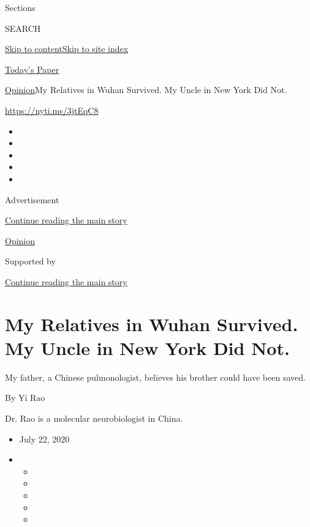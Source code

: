 Sections

SEARCH

\protect\hyperlink{site-content}{Skip to
content}\protect\hyperlink{site-index}{Skip to site index}

\href{https://myaccount.nytimes.com/auth/login?response_type=cookie\&client_id=vi}{}

\href{https://www.nytimes.com/section/todayspaper}{Today's Paper}

\href{/section/opinion}{Opinion}\textbar{}My Relatives in Wuhan
Survived. My Uncle in New York Did Not.

\href{https://nyti.ms/3jtEqC8}{https://nyti.ms/3jtEqC8}

\begin{itemize}
\item
\item
\item
\item
\item
\end{itemize}

Advertisement

\protect\hyperlink{after-top}{Continue reading the main story}

\href{/section/opinion}{Opinion}

Supported by

\protect\hyperlink{after-sponsor}{Continue reading the main story}

\hypertarget{my-relatives-in-wuhan-survived-my-uncle-in-new-york-did-not}{%
\section{My Relatives in Wuhan Survived. My Uncle in New York Did
Not.}\label{my-relatives-in-wuhan-survived-my-uncle-in-new-york-did-not}}

My father, a Chinese pulmonologist, believes his brother could have been
saved.

By Yi Rao

Dr. Rao is a molecular neurobiologist in China.

\begin{itemize}
\item
  July 22, 2020
\item
  \begin{itemize}
  \item
  \item
  \item
  \item
  \item
  \end{itemize}
\end{itemize}

